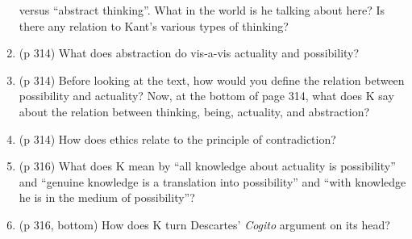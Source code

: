 \documentclass[fleqn,12pt]{article}
\begin{document}
\begin{enumerate}
  versus ``abstract thinking''.  What in the world is he talking about
  here?  Is there any relation to Kant's various types of thinking?
\item (p 314) What does abstraction do vis-a-vis actuality and
  possibility?
\item (p 314) Before looking at the text, how would you define the
  relation between possibility and actuality?  Now, at the bottom of
  page 314, what does K say about the relation between thinking,
  being, actuality, and abstraction?
\item (p 314) How does ethics relate to the principle of
  contradiction?
\item (p 316) What does K mean by ``all knowledge about actuality is
  possibility'' and ``genuine knowledge is a translation into
  possibility'' and ``with knowledge he is in the medium of
  possibility''?
\item (p 316, bottom) How does K turn Descartes' {\it Cogito} argument
  on its head?
  

\end{enumerate}
\end{document}
